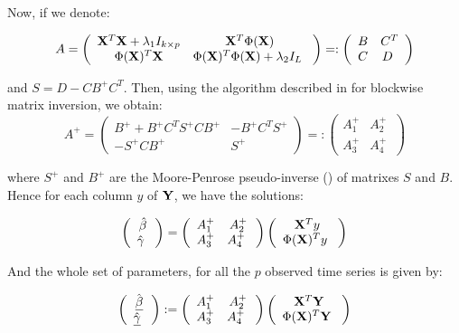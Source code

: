 Now, if we denote:

$$ A = \left( {\begin{array}{cc} {\bf X}^T{\bf X} + \lambda_1 I_{k\times p} &  {\bf X}^T\Phi({\bf X})\\
\Phi({\bf X})^T{\bf X} & \Phi({\bf X})^T\Phi({\bf X}) + \lambda_2 I_{L} \      \end{array} } \right) =:
\left( {\begin{array}{cc} B &  C^T\\ C & D \      \end{array} } \right) $$

and $S = D - CB^+C^T$. Then, using the algorithm described in \cite{cormen2009introduction} for blockwise matrix inversion, we obtain: $$ A^+ = \left( {\begin{array}{cc} B^+ + B^+ C^T
S^+ CB^+  &  -B^+ C^T S^+\\ -S^+CB^+ & S^+ \      \end{array} } \right) =:
\left( {\begin{array}{cc} A_1^+  &  A_2^+\\ A_3^+ & A_4^+ \      \end{array} }
\right) $$


where $S^+$ and $B^+$ are the Moore-Penrose pseudo-inverse (\cite{penrose1955generalized}) of matrixes $S$ and
$B$. Hence for each column $y$ of ${\bf Y}$, we have the solutions:

$$
\left( {\begin{array}{c} \hat{\beta} \\       \hat{\gamma} \      \end{array}
} \right) = \left( {\begin{array}{cc} A_1^+  &  A_2^+\\ A_3^+ & A_4^+ \
\end{array} } \right)\left( {\begin{array}{c} {\bf X}^Ty \\       \Phi({\bf X})^Ty \
\end{array} } \right)
$$

And the whole set of parameters, for all the $p$ observed time series is given by:

$$
\left( {\begin{array}{c} \hat{\underline{\beta}} \\       \hat{\underline{\gamma}} \      \end{array}
} \right) := \left( {\begin{array}{cc} A_1^+  &  A_2^+\\ A_3^+ & A_4^+ \      \end{array}
} \right)\left( {\begin{array}{c} {\bf X}^T{\bf Y} \\       \Phi({\bf X})^T{\bf Y} \      \end{array} }
\right)
$$

